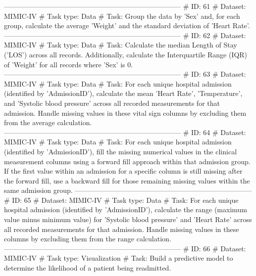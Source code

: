 \begin{tcolorbox}[colback=cadmiumgreen!5!white,colframe=forestgreen!75!white,breakable,title=\textit{Generated analytical tasks in task 4.}]
\begin{VerbatimWrap}
-----------------------------------------------------------------------------
# ID: 61  
# Dataset: MIMIC-IV 
# Task type: Data
# Task: Group the data by 'Sex' and, for each group, calculate the average 'Weight' and the standard deviation of 'Heart Rate'.
-----------------------------------------------------------------------------
# ID: 62  
# Dataset: MIMIC-IV 
# Task type: Data
# Task: Calculate the median Length of Stay ('LOS') across all records. Additionally, calculate the Interquartile Range (IQR) of 'Weight' for all records where 'Sex' is 0.
-----------------------------------------------------------------------------
# ID: 63  
# Dataset: MIMIC-IV 
# Task type: Data
# Task: For each unique hospital admission (identified by 'AdmissionID'), calculate the mean 'Heart Rate', 'Temperature', and 'Systolic blood pressure' across all recorded measurements for that admission. Handle missing values in these vital sign columns by excluding them from the average calculation.
-----------------------------------------------------------------------------
# ID: 64  
# Dataset: MIMIC-IV 
# Task type: Data
# Task: For each unique hospital admission (identified by 'AdmissionID'), fill the missing numerical values in the clinical measurement columns using a forward fill approach within that admission group. If the first value within an admission for a specific column is still missing after the forward fill, use a backward fill for those remaining missing values within the same admission group.
-----------------------------------------------------------------------------
# ID: 65  
# Dataset: MIMIC-IV 
# Task type: Data
# Task: For each unique hospital admission (identified by 'AdmissionID'), calculate the range (maximum value minus minimum value) for 'Systolic blood pressure' and 'Heart Rate' across all recorded measurements for that admission. Handle missing values in these columns by excluding them from the range calculation.
-----------------------------------------------------------------------------
# ID: 66  
# Dataset: MIMIC-IV 
# Task type: Visualization
# Task: Build a predictive model to determine the likelihood of a patient being readmitted.
 

\end{VerbatimWrap}
\end{tcolorbox}
